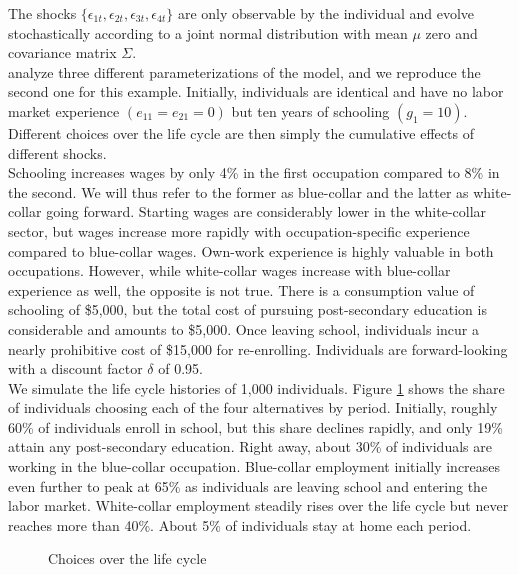 \noindent The shocks $\{\epsilon_{1t},\epsilon_{2t},\epsilon_{3t},\epsilon_{4t}\}$ are only observable by the individual and evolve stochastically according to a joint normal distribution with mean $\mu$ zero and covariance matrix $\Sigma$.\\

\noindent \citet{Keane.1994} analyze three different parameterizations of the model, and we reproduce the second one for this example. Initially, individuals are identical and have no labor market experience $(e_{11} = e_{21} = 0)$ but ten years of schooling $(g_1 = 10)$. Different choices over the life cycle are then simply the cumulative effects of different shocks.\\

\noindent Schooling increases wages by only 4\% in the first occupation compared to 8\% in the second. We will thus refer to the former as blue-collar and the latter as white-collar going forward. Starting wages are considerably lower in the white-collar sector, but wages increase more rapidly with occupation-specific experience compared to blue-collar wages. Own-work experience is highly valuable in both occupations. However, while white-collar wages increase with blue-collar experience as well, the opposite is not true. There is a consumption value of schooling of \$5,000, but the total cost of pursuing post-secondary education is considerable and amounts to \$5,000. Once leaving school, individuals incur a nearly prohibitive cost of \$15,000 for re-enrolling. Individuals are forward-looking with a discount factor $\delta$ of 0.95.\\

\noindent We simulate the life cycle histories of 1,000 individuals. Figure \ref{Choices over the life cycle} shows the share of individuals choosing each of the four alternatives by period. Initially, roughly 60\% of individuals enroll in school, but this share declines rapidly, and only 19\% attain any post-secondary education. Right away, about 30\% of individuals are working in the blue-collar occupation.  Blue-collar employment initially increases even further to peak at 65\% as individuals are leaving school and entering the labor market. White-collar employment steadily rises over the life cycle but never reaches more than 40\%. About 5\% of individuals stay at home each period.

\begin{figure}[ht!]\centering
\caption{Choices over the life cycle}\label{Choices over the life cycle}
\end{figure}\FloatBarrier


